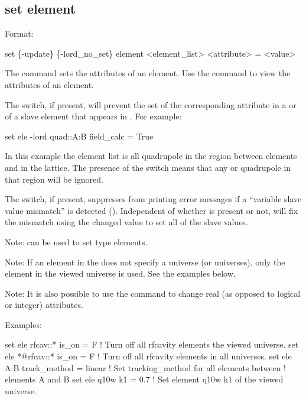 {{%

\subsection{set element}
\label{s:set.element}

Format:
\begin{example}
  set \{-update\} \{-lord_no_set\} element <element_list> <attribute> = <value>
\end{example}

The  command sets the attributes of an element. Use the 
command to view the attributes of an element.

The  switch, if present, will prevent the set of the corresponding attribute in a
 or  of a slave element that appears in . For
example:
\begin{example}
  set ele -lord quad::A:B field_calc = True
\end{example}
In this example the element list is all quadrupole in the region between elements  and 
in the lattice. The presence of the  switch means that any  or
 quadrupole in that region will be ignored.

The  switch, if present, suppresses \tao from printing error messages if a ``variable
slave value mismatch'' is detected (). Independent of whether  is
present or not, \tao will fix the mismatch using the changed value to set all of the slave values.

Note:  can be used to set  type elements.

Note: If an element in the  does not specify a universe (or universes),
only the element in the viewed universe is used. See the examples below.

Note: It is also possible to use the  command to change real (as opposed to
logical or integer) attributes.

Examples:
\begin{example}
  set ele rfcav::* is_on = F        ! Turn off all rfcavity elements the viewed universe.
  set ele *@rfcav::* is_on = F      ! Turn off all rfcavity elements in all universes.
  set ele A:B track_method = linear ! Set tracking_method for all elements between 
                                    !   elements A and B
  set ele q10w k1 = 0.7             ! Set element q10w k1 of the viewed universe.
\end{example}

}}
